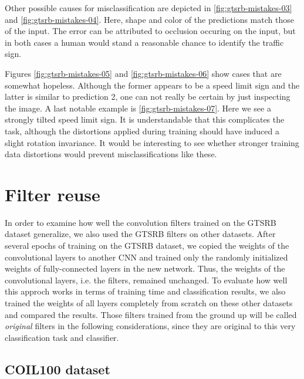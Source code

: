 \documentclass[11pt, a4paper]{article}
\begin{document}
Other possible causes for misclassification are depicted in \ref{fig:gtsrb-mistakes-03} and \ref{fig:gtsrb-mistakes-04}. Here, shape and color of the predictions match those of the input. The error can be attributed to occlusion occuring on the input, but in both cases a human would stand a reasonable chance to identify the traffic sign.

Figures \ref{fig:gtsrb-mistakes-05} and \ref{fig:gtsrb-mistakes-06} show cases that are somewhat hopeless. Although the former appears to be a speed limit sign and the latter is similar to prediction 2, one can not really be certain by just inspecting the image. A last notable example is \ref{fig:gtsrb-mistakes-07}. Here we see a strongly tilted speed limit sign. It is understandable that this complicates the task, although the distortions applied during training should have induced a slight rotation invariance. It would be interesting to see whether stronger training data distortions would prevent misclassifications like these.

\section{Filter reuse}

In order to examine how well the convolution filters trained on the GTSRB dataset generalize, we also used the GTSRB filters on other datasets. After several epochs of training on the GTSRB dataset, we copied the weights of the convolutional layers to another CNN and trained only the randomly initialized weights of fully-connected layers in the new network. Thus, the weights of the convolutional layers, i.e. the filters, remained unchanged. To evaluate how well this approch works in terms of training time and classification results, we also trained the weights of all layers completely from scratch on these other datasets and compared the results. Those filters trained from the ground up will be called \textit{original} filters in the following considerations, since they are original to this very classification task and classifier.

\subsection{COIL100 dataset}
\end{document}

